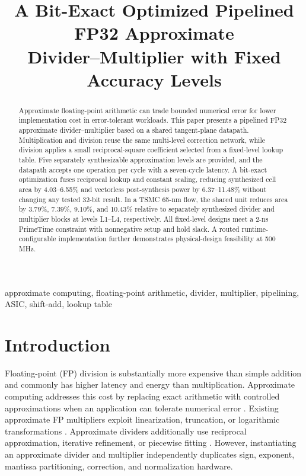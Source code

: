 \documentclass[conference]{IEEEtran}
\title{A Bit-Exact Optimized Pipelined FP32 Approximate\\
Divider--Multiplier with Fixed Accuracy Levels}
\author{%
  \IEEEauthorblockN{\todo{Author names}}
  \IEEEauthorblockA{\todo{Affiliation, city, country, and email}}
}
\begin{document}
\maketitle

\begin{abstract}
Approximate floating-point arithmetic can trade bounded numerical error for
lower implementation cost in error-tolerant workloads. This paper presents a
pipelined FP32 approximate divider--multiplier based on a shared tangent-plane
datapath. Multiplication and division reuse the same multi-level correction
network, while division applies a small reciprocal-square coefficient selected
from a fixed-level lookup table. Five separately synthesizable approximation
levels are provided, and the datapath accepts one operation per cycle with a
seven-cycle latency. A bit-exact optimization fuses reciprocal lookup and
constant scaling, reducing synthesized cell area by 4.03--6.55\% and
vectorless post-synthesis power by 6.37--11.48\% without changing any tested
32-bit result. In a TSMC 65-nm flow, the shared unit reduces area by 3.79\%,
7.39\%, 9.10\%, and 10.43\% relative to separately synthesized divider and
multiplier blocks at levels L1--L4, respectively. All fixed-level designs meet
a 2-ns PrimeTime constraint with nonnegative setup and hold slack. A routed
runtime-configurable implementation further demonstrates physical-design
feasibility at 500 MHz.
\end{abstract}

\begin{IEEEkeywords}
approximate computing, floating-point arithmetic, divider, multiplier,
pipelining, ASIC, shift-add, lookup table
\end{IEEEkeywords}

\section{Introduction}
Floating-point (FP) division is substantially more expensive than simple
addition and commonly has higher latency and energy than multiplication.
Approximate computing addresses this cost by replacing exact arithmetic with
controlled approximations when an application can tolerate numerical error
\cite{han2013approx}. Existing approximate FP multipliers exploit
linearization, truncation, or logarithmic transformations
\cite{chen2020oam,imani2019approxl}. Approximate dividers additionally use
reciprocal approximation, iterative refinement, or piecewise fitting
\cite{saadat2019divider,wen2024pace}. However, instantiating an approximate
divider and multiplier independently duplicates sign, exponent, mantissa
partitioning, correction, and normalization hardware.
\end{document}
